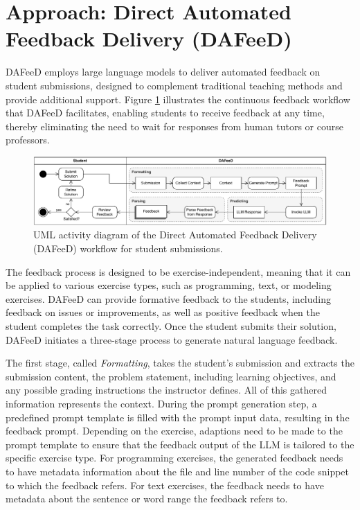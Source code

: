 \documentclass[manuscript,screen,review]{acmart}
\begin{document}


\section{Approach: Direct Automated Feedback Delivery (DAFeeD)} %
\label{sec:approach:DAFeeD}

DAFeeD employs large language models to deliver automated feedback on student submissions, designed to complement traditional teaching methods and provide additional support.
Figure \ref{fig:DAFeeD-workflow} illustrates the continuous feedback workflow that DAFeeD facilitates, enabling students to receive feedback at any time, thereby eliminating the need to wait for responses from human tutors or course professors.

\begin{figure}[htbp]
  \centering
  \includegraphics[width=\linewidth]{figures/DAFeeD-ActivityDiagram_alternative.pdf}
  \caption{UML activity diagram of the Direct Automated Feedback Delivery (DAFeeD) workflow for student submissions.}
  \label{fig:DAFeeD-workflow}
\end{figure}

The feedback process is designed to be exercise-independent, meaning that it can be applied to various exercise types, such as programming, text, or modeling exercises.
DAFeeD can provide formative feedback to the students, including feedback on issues or improvements, as well as positive feedback when the student completes the task correctly.
Once the student submits their solution, DAFeeD initiates a three-stage process to generate natural language feedback.

The first stage, called \textit{Formatting}, takes the student's submission and extracts the submission content, the problem statement, including learning objectives, and any possible grading instructions the instructor defines.
All of this gathered information represents the context.
During the prompt generation step, a predefined prompt template is filled with the prompt input data, resulting in the feedback prompt.
Depending on the exercise, adaptions need to be made to the prompt template to ensure that the feedback output of the LLM is tailored to the specific exercise type.
For programming exercises, the generated feedback needs to have metadata information about the file and line number of the code snippet to which the feedback refers.
For text exercises, the feedback needs to have metadata about the sentence or word range the feedback refers to.
\end{document}
